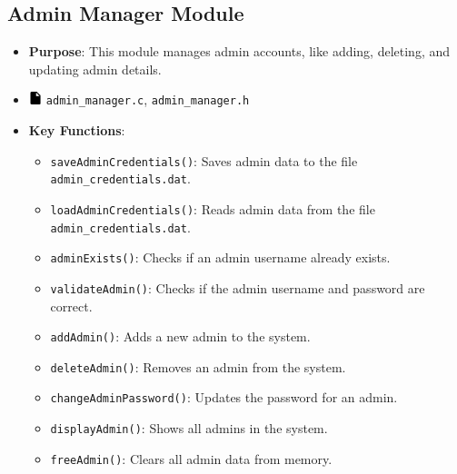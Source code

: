 \documentclass[12pt,a4paper]{report}
\begin{document}
\subsection{Admin Manager Module}
\begin{itemize}
    \item \normalsize \textbf{Purpose}: This module manages admin accounts, like adding, deleting, and updating admin details.
    \item \normalsize \includegraphics[width=0.03\textwidth]{../resources/assets/images/file_icon.png} \texttt{admin\_manager.c}, \texttt{admin\_manager.h}
    \item \normalsize \textbf{Key Functions}:
    \begin{itemize}
        \item \texttt{saveAdminCredentials()}: Saves admin data to the file \texttt{admin\_credentials.dat}.
        \item \texttt{loadAdminCredentials()}: Reads admin data from the file \texttt{admin\_credentials.dat}.
        \item \texttt{adminExists()}: Checks if an admin username already exists.
        \item \texttt{validateAdmin()}: Checks if the admin username and password are correct.
        \item \texttt{addAdmin()}: Adds a new admin to the system.
        \item \texttt{deleteAdmin()}: Removes an admin from the system.
        \item \texttt{changeAdminPassword()}: Updates the password for an admin.
        \item \texttt{displayAdmin()}: Shows all admins in the system.
        \item \texttt{freeAdmin()}: Clears all admin data from memory.
    \end{itemize}
\end{itemize}
\end{document}
